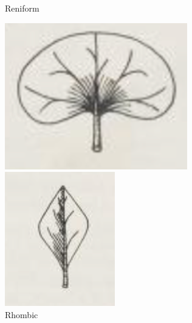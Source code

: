 \documentclass[12pt,english]{article}
\begin{document}
\begin{figure}[!hbt]
\begin{centre}
\begin{minipage}{0.19\textwidth}
	\end{minipage}
\end{centre}
\end{figure}

\begin{figure}[!hbt]
\begin{centre}
	\begin{minipage}{0.19\textwidth}
		\caption{Reniform}
		\includegraphics[width=\textwidth]{../code/contour/original/reniform}
	\end{minipage}
	\begin{minipage}{0.19\textwidth}
		\caption{Rhombic}
		\includegraphics[width=\textwidth]{../code/contour/original/rhombic}

\end{minipage}
\end{centre}
\end{figure}
\end{document}
